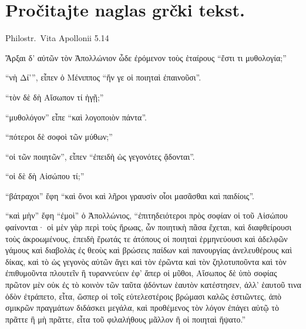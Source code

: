 
\section*{Pročitajte naglas grčki tekst.}

Philostr.\ Vita Apollonii 5.14


\medskip

\begin{greek}
{\large
{ \noindent  Ἄρξαι δ' αὐτῶν τὸν Ἀπολλώνιον ὧδε ἐρόμενον τοὺς ἑταίρους ``ἔστι τι μυθολογία;'' 

\noindent ``νὴ Δί'”, εἶπεν ὁ Μένιππος ``ἥν γε οἱ ποιηταὶ ἐπαινοῦσι''. 

\noindent ``τὸν δὲ δὴ Αἴσωπον τί ἡγῇ;'' 

\noindent ``μυθολόγον'' εἶπε ``καὶ λογοποιὸν πάντα''. 

\noindent ``πότεροι δὲ σοφοὶ τῶν μύθων;'' 

\noindent ``οἱ τῶν ποιητῶν'', εἶπεν ``ἐπειδὴ ὡς γεγονότες ᾄδονται''. 

\noindent ``οἱ δὲ δὴ Αἰσώπου τί;'' 

\noindent ``βάτραχοι'' ἔφη ``καὶ ὄνοι καὶ λῆροι γραυσὶν οἷοι μασᾶσθαι καὶ παιδίοις''. 

\noindent ``καὶ μὴν'' ἔφη ``ἐμοὶ'' ὁ Ἀπολλώνιος, ``ἐπιτηδειότεροι πρὸς σοφίαν οἱ τοῦ Αἰσώπου φαίνονται· οἱ μὲν γὰρ περὶ τοὺς ἥρωας, ὧν ποιητικὴ πᾶσα ἔχεται, καὶ διαφθείρουσι τοὺς ἀκροωμένους, ἐπειδὴ ἔρωτάς τε ἀτόπους οἱ ποιηταὶ ἑρμηνεύουσι καὶ ἀδελφῶν γάμους καὶ διαβολὰς ἐς θεοὺς καὶ βρώσεις παίδων καὶ πανουργίας ἀνελευθέρους καὶ δίκας, καὶ τὸ ὡς γεγονὸς αὐτῶν ἄγει καὶ τὸν ἐρῶντα καὶ τὸν ζηλοτυποῦντα καὶ τὸν ἐπιθυμοῦντα πλουτεῖν ἢ τυραννεύειν ἐφ' ἅπερ οἱ μῦθοι, Αἴσωπος δὲ ὑπὸ σοφίας πρῶτον μὲν οὐκ ἐς τὸ κοινὸν τῶν ταῦτα ᾀδόντων ἑαυτὸν κατέστησεν, ἀλλ' ἑαυτοῦ τινα ὁδὸν ἐτράπετο, εἶτα, ὥσπερ οἱ τοῖς εὐτελεστέροις βρώμασι καλῶς ἑστιῶντες, ἀπὸ σμικρῶν πραγμάτων διδάσκει μεγάλα, καὶ προθέμενος τὸν λόγον ἐπάγει αὐτῷ τὸ πρᾶττε ἢ μὴ πρᾶττε, εἶτα τοῦ φιλαλήθους μᾶλλον ἢ οἱ ποιηταὶ ἥψατο.''

}
}
\end{greek}

